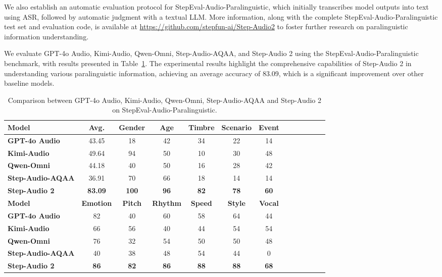 We also establish an automatic evaluation protocol for StepEval-Audio-Paralinguistic, which initially transcribes model outputs into text using ASR, followed by automatic judgment with a textual LLM. More information, along with the complete StepEval-Audio-Paralinguistic test set and evaluation code, is available at \url{https://github.com/stepfun-ai/Step-Audio2} to foster further research on paralinguistic information understanding.

We evaluate GPT-4o Audio, Kimi-Audio, Qwen-Omni, Step-Audio-AQAA, and Step-Audio 2 using the StepEval-Audio-Paralinguistic benchmark, with results presented in Table~\ref{tab:paralinguistic}. The experimental results highlight the comprehensive capabilities of Step-Audio 2 in understanding various paralinguistic information, achieving an average accuracy of 83.09, which is a significant improvement over other baseline models.

\begin{table}[htb]
\caption{Comparison between GPT-4o Audio, Kimi-Audio, Qwen-Omni, Step-Audio-AQAA and Step-Audio 2 on StepEval-Audio-Paralinguistic.}
\label{tab:paralinguistic}
\centering
\begin{tabular}{lcccccccccccc}
\toprule
\textbf{Model} &\textbf{Avg.} &\textbf{Gender} & \textbf{Age} & \textbf{Timbre} & \textbf{Scenario} & \textbf{Event}  \\
\midrule
\textbf{GPT-4o Audio} & 43.45 & 18 & 42 & 34 & 22 & 14 \\
\textbf{Kimi-Audio} & 49.64 & 94 & 50 & 10 & 30 & 48 & \\
\textbf{Qwen-Omni} & 44.18 & 40 & 50 & 16 & 28 & 42  \\
\textbf{Step-Audio-AQAA} & 36.91 & 70 & 66 & 18 & 14 & 14  \\
\textbf{Step-Audio 2} & \textbf{83.09} & \textbf{100} & \textbf{96} & \textbf{82} & \textbf{78} & \textbf{60} \\
\midrule
\textbf{Model} &\textbf{Emotion} & \textbf{Pitch} & \textbf{Rhythm} & \textbf{Speed} & \textbf{Style} & \textbf{Vocal} \\
\midrule
\textbf{GPT-4o Audio} & 82 & 40 & 60 & 58 & 64 & 44  \\
\textbf{Kimi-Audio} & 66 & 56 & 40 & 44 & 54 & 54 \\
\textbf{Qwen-Omni} & 76 & 32 & 54 & 50 & 50 & 48 \\
\textbf{Step-Audio-AQAA} & 40 & 38 & 48 & 54 & 44 & 0  \\
\textbf{Step-Audio 2} & \textbf{86} & \textbf{82} & \textbf{86} & \textbf{88} & \textbf{88} & \textbf{68} \\
\bottomrule
\end{tabular}
\end{table}

